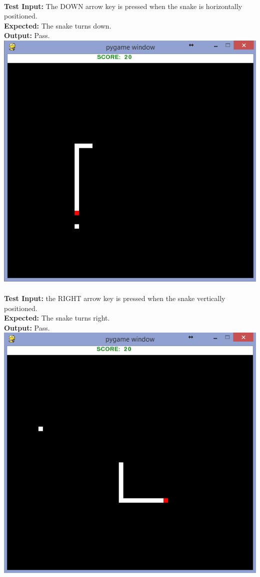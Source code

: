 \documentclass[12pt]{article}
\begin{document}
\\
\textbf{Test Input:} The DOWN arrow key is pressed when the snake is horizontally positioned.\\
\textbf{Expected:} The snake turns down.\\
\textbf{Output:} Pass.\\
\pagebreak
\includegraphics[width=\textwidth]{snakedown.png}\\
\\
\textbf{Test Input:} the RIGHT arrow key is pressed when the snake vertically positioned.\\
\textbf{Expected:} The snake turns right.\\
\textbf{Output:} Pass.\\
\pagebreak
\includegraphics[width=\textwidth]{snakeright.png}\\
\end{document}
